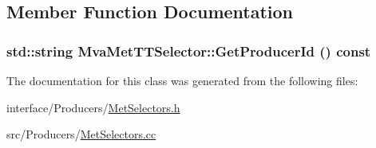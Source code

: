 \subsection{Member Function Documentation}
\hypertarget{classMvaMetTTSelector_a37ef7c582dbd436af3cb76f34677960a}{
\subsubsection[{GetProducerId}]{\setlength{\rightskip}{0pt plus 5cm}std::string MvaMetTTSelector::GetProducerId () const}}
\label{classMvaMetTTSelector_a37ef7c582dbd436af3cb76f34677960a}


The documentation for this class was generated from the following files:\begin{DoxyCompactItemize}
\item 
interface/Producers/\hyperlink{MetSelectors_8h}{MetSelectors.h}\item 
src/Producers/\hyperlink{MetSelectors_8cc}{MetSelectors.cc}\end{DoxyCompactItemize}
